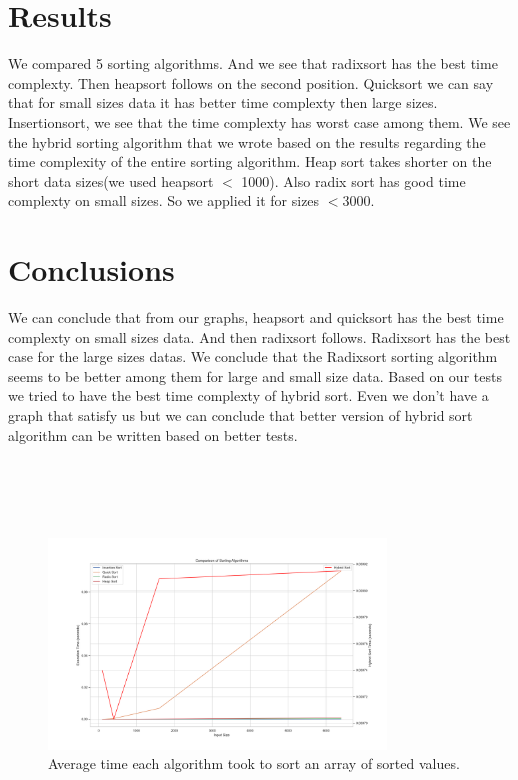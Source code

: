 \documentclass{article}
\begin{document}
\maketitle
\section{Results}
We compared 5 sorting algorithms. And we see that radixsort has the best time complexty. Then heapsort follows on the second position.
Quicksort we can say that for small sizes data it has better time complexty then large sizes.
Insertionsort, we see that the time complexty has worst case among them.
We see the hybrid sorting algorithm that we wrote based on the results regarding the time complexity of the entire sorting algorithm. 
Heap sort takes shorter on the short data sizes(we used heapsort $<$ 1000). Also radix sort has good time complexty on small sizes. So we applied it for sizes $<3000$.

\newpage

\maketitle
\section{Conclusions}
We can conclude that from our graphs, heapsort and quicksort has the best time complexty on small sizes data. And then radixsort follows. 
Radixsort has the best case for the large sizes datas.
We conclude that the Radixsort sorting algorithm seems to be better among them for large and small size data.
Based on our tests we tried to have the best time complexty of hybrid sort. Even we don't have a graph that satisfy us but we can conclude that better version of hybrid sort algorithm can be written based on better tests. 
\\ \\ \\ \\ \\

\begin{figure}[h]
\centering
\includegraphics[width=0.8\textwidth]{../graph/all_algorithms.png}
\caption{Average time each algorithm took to sort an array of sorted values.}
\label{avg:best}
\end{figure}
\end{document}
